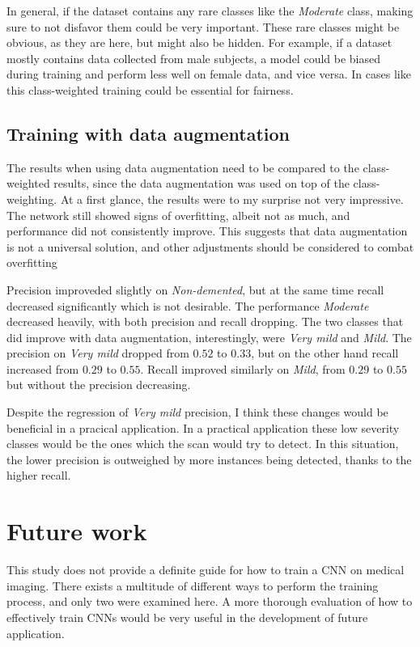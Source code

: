 \documentclass{kththesis}
\begin{document}
In general, if the dataset contains any rare classes like the \textit{Moderate} class, making sure to not disfavor them could be very important. These rare classes might be obvious, as they are here, but might also be hidden. For example, if a dataset mostly contains data collected from male subjects, a model could be biased during training and perform less well on female data, and vice versa. In cases like this class-weighted training could be essential for fairness.

\subsection{Training with data augmentation}
The results when using data augmentation need to be compared to the class-weighted results, since the data augmentation was used on top of the class-weighting. At a first glance, the results were to my surprise not very impressive. The network still showed signs of overfitting, albeit not as much, and performance did not consistently improve. This suggests that data augmentation is not a universal solution, and other adjustments should be considered to combat overfitting

Precision improveded slightly on \textit{Non-demented}, but at the same time recall decreased significantly which is not desirable. The performance \textit{Moderate} decreased heavily, with both precision and recall dropping. The two classes that did improve with data augmentation, interestingly, were \textit{Very mild} and \textit{Mild}. The precision on \textit{Very mild} dropped from $0.52$ to $0.33$, but on the other hand recall increased from $0.29$ to $0.55$. Recall improved similarly on \textit{Mild}, from $0.29$ to $0.55$ but without the precision decreasing.

Despite the regression of \textit{Very mild} precision, I think these changes would be beneficial in a pracical application. In a practical application these low severity classes would be the ones which the scan would try to detect. In this situation, the lower precision is outweighed by more instances being detected, thanks to the higher recall.

\section{Future work}
This study does not provide a definite guide for how to train a CNN on medical imaging. There exists a multitude of different ways to perform the training process, and only two were examined here. A more thorough evaluation of how to effectively train CNNs would be very useful in the development of future application.
\end{document}
